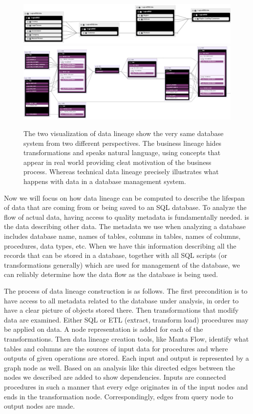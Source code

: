 \begin{figure}[H]
	\centering
	\includegraphics[width=14cm]{../img/BusinessLineage}
	\includegraphics[width=14cm]{../img/TechnicalLineage}
	\caption[Technical Lineage versus Business Lineage]{The two visualization of data lineage show the very same database system from two different perspectives. The business lineage hides transformations and speaks natural language, using concepts that appear in real world providing cleat motivation of the business process. 
		Whereas technical data lineage precisely illustrates what happens with data in a database management system.}
	\label{BusinessVsTechnicalLineage}
\end{figure}

Now we will focus on how data lineage can be computed to describe the lifespan of data that are coming from or being saved to an SQL database.
To analyze the flow of actual data, having access to quality metadata is fundamentally needed.
 is the data describing other data. The metadata we use when analyzing a database includes database name, names of tables, columns in tables, names of columns, procedures, data types, etc.
When we have this information describing all the records that can be stored in a database, together with all SQL scripts (or transformations generally) which are used for management of the database, we can reliably determine how the data flow as the database is being used.

The process of data lineage construction is as follows. The first precondition is to have access to all metadata related to the database under analysis, in order to have a clear picture of objects stored there. 
Then transformations that modify data are examined. 
Either SQL or ETL (extract, transform load) procedures may be applied on data.
A node representation is added for each of the transformations. 
Then data lineage creation tools, like Manta Flow, identify what tables and columns are the sources of input data for procedures and where outputs of given operations are stored. 
Each input and output is represented by a graph node as well. Based on an analysis like this directed edges between the nodes we described are added to show dependencies. Inputs are connected procedures in such a manner that every edge originates in of the input nodes and ends in the transformation node. Correspondingly, edges from query node to output nodes are made.


